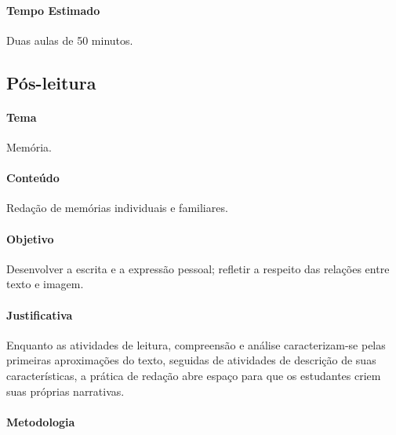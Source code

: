 \documentclass[11pt]{extarticle}
\begin{document}

\paragraph{Tempo Estimado} Duas aulas de 50 minutos. 

\subsection{Pós-leitura} 


\paragraph{Tema} Memória. 

\paragraph{Conteúdo} Redação de memórias individuais e familiares. 

\paragraph{Objetivo} Desenvolver a escrita e a expressão pessoal; refletir a respeito das relações entre texto e imagem.

\paragraph{Justificativa} Enquanto as atividades de leitura, compreensão e análise caracterizam-se pelas primeiras aproximações do texto, seguidas de atividades de descrição de suas características, a prática de redação abre espaço para que os estudantes criem suas próprias narrativas. 

\paragraph{Metodologia}
\end{document}
